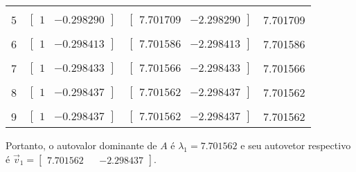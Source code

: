 \documentclass[a4paper,11pt]{article}
\begin{document}
\begin{enumerate}[label=\textbf{(\alph*)}]
\begin{center}
\begin{tabular}{ | c | c | c | c | }
                    & & & \\ [-1em]
                    5 & $\begin{bmatrix} 1 & -0.298290 \end{bmatrix}$ & $\begin{bmatrix}  7.701709 & -2.298290 \end{bmatrix}$  & 7.701709 \\ [+.5em]
                    \hline
                    & & & \\ [-1em]
                    6 & $\begin{bmatrix} 1 & -0.298413 \end{bmatrix}$ & $\begin{bmatrix} 7.701586 & -2.298413 \end{bmatrix}$  & 7.701586\\ [+.5em]
                    \hline
                    & & & \\ [-1em]
                    7 & $\begin{bmatrix} 1 & -0.298433 \end{bmatrix}$ & $\begin{bmatrix} 7.701566 & -2.298433 \end{bmatrix}$  & 7.701566\\ [+.5em]
                    \hline
                    & & & \\ [-1em]
                    8 & $\begin{bmatrix} 1 & -0.298437 \end{bmatrix}$ & $\begin{bmatrix} 7.701562 & -2.298437 \end{bmatrix}$  & 7.701562\\ [+.5em]
                    \hline
                    & & & \\ [-1em]
                    9 & $\begin{bmatrix} 1 & -0.298437 \end{bmatrix}$ & $\begin{bmatrix} 7.701562 & -2.298437 \end{bmatrix}$  & 7.701562\\ [+.5em]
                    \hline
                \end{tabular}
            \end{center}
            Portanto, o autovalor dominante de $A$ é $\lambda _1 = 7.701562$ e seu autovetor respectivo é $\vec{v}_ 1 = \begin{bmatrix} 7.701562 && -2.298437 \end{bmatrix}$.

\end{enumerate}
\end{document}
